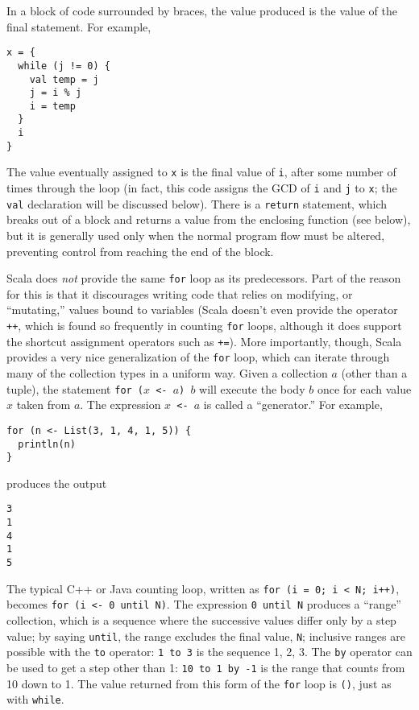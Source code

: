 In a block of code surrounded by braces, the value produced is the value of the final statement. For example,
\begin{verbatim}
x = {
  while (j != 0) {
    val temp = j
    j = i % j
    i = temp
  }
  i
}
\end{verbatim}
The value eventually assigned to \texttt{x} is the final value of \texttt{i}, after some number of times through the loop (in fact, this code assigns the GCD of \texttt{i} and \texttt{j} to \texttt{x}; the \texttt{val} declaration will be discussed below). There is a \texttt{return} statement, which breaks out of a block and returns a value from the enclosing function (see below), but it is generally used only when the normal program flow must be altered, preventing control from reaching the end of the block.

Scala does \emph{not} provide the same \texttt{for} loop as its predecessors. Part of the reason for this is that it discourages writing code that relies on modifying, or ``mutating,'' values bound to variables (Scala doesn't even provide the operator \texttt{++}, which is found so frequently in counting \texttt{for} loops, although it does support the shortcut assignment operators such as \texttt{+=}). More importantly, though, Scala provides a very nice generalization of the \texttt{for} loop, which can iterate through many of the collection types in a uniform way. Given a collection $a$ (other than a tuple), the statement \texttt{for ($x$ <- $a$) $b$} will execute the body $b$ once for each value $x$ taken from $a$. The expression \texttt{$x$ <- $a$} is called a ``generator.'' For example,
\begin{verbatim}
for (n <- List(3, 1, 4, 1, 5)) {
  println(n)
}
\end{verbatim}
produces the output
\begin{verbatim}
3
1
4
1
5
\end{verbatim}
The typical C++ or Java counting loop, written as \texttt{for (i = 0; i < N; i++)}, becomes \texttt{for (i <- 0 until N)}. The expression \texttt{0 until N} produces a ``range'' collection, which is a sequence where the successive values differ only by a step value; by saying \texttt{until}, the range excludes the final value, \texttt{N}; inclusive ranges are possible with the \texttt{to} operator: \texttt{1 to 3} is the sequence 1, 2, 3. The \texttt{by} operator can be used to get a step other than 1: \texttt{10 to 1 by -1} is the range that counts from 10 down to 1. The value returned from this form of the \texttt{for} loop is \texttt{()}, just as with \texttt{while}.

